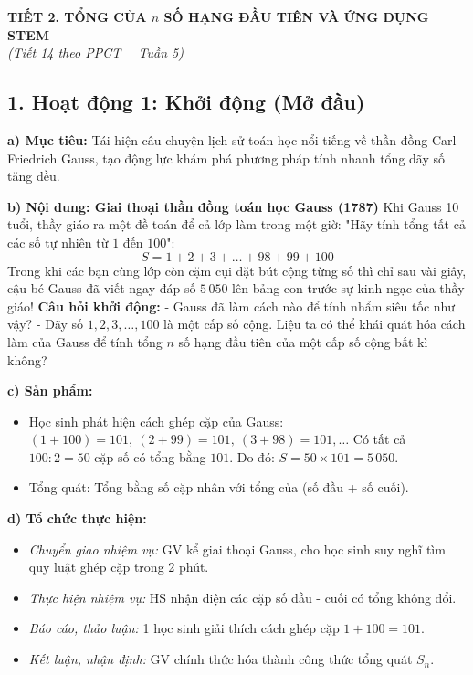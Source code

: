 \documentclass[12pt, a4paper]{article}
\begin{document}
\vspace{10pt}  
\begin{center}  
    {\fontsize{13pt}{16pt}\selectfont \textbf{TIẾT 2. TỔNG CỦA $n$ SỐ HẠNG ĐẦU TIÊN VÀ ỨNG DỤNG STEM}}\\[2pt]  
    \textit{(Tiết 14 theo PPCT \ \textbar \ Tuần 5)}  
\end{center}  
  
\subsection*{1. Hoạt động 1: Khởi động (Mở đầu)}  
  
\noindent \textbf{a) Mục tiêu:}  
Tái hiện câu chuyện lịch sử toán học nổi tiếng về thần đồng Carl Friedrich Gauss, tạo động lực khám phá phương pháp tính nhanh tổng dãy số tăng đều.  
  
\noindent \textbf{b) Nội dung: Giai thoại thần đồng toán học Gauss (1787)}  
Khi Gauss 10 tuổi, thầy giáo ra một đề toán để cả lớp làm trong một giờ: "Hãy tính tổng tất cả các số tự nhiên từ $1$ đến $100$":  
$$S = 1 + 2 + 3 + \dots + 98 + 99 + 100$$  
Trong khi các bạn cùng lớp còn cặm cụi đặt bút cộng từng số thì chỉ sau vài giây, cậu bé Gauss đã viết ngay đáp số $5\,050$ lên bảng con trước sự kinh ngạc của thầy giáo!  
\textbf{Câu hỏi khởi động:}  
- Gauss đã làm cách nào để tính nhẩm siêu tốc như vậy?  
- Dãy số $1, 2, 3, \dots, 100$ là một cấp số cộng. Liệu ta có thể khái quát hóa cách làm của Gauss để tính tổng $n$ số hạng đầu tiên của một cấp số cộng bất kì không?  
  
\noindent \textbf{c) Sản phẩm:}  
\begin{itemize}[leftmargin=0.8cm]  
    \item Học sinh phát hiện cách ghép cặp của Gauss:  
    $(1 + 100) = 101,\ (2 + 99) = 101,\ (3 + 98) = 101,\dots$  
    Có tất cả $100 : 2 = 50$ cặp số có tổng bằng $101$.  
    Do đó: $S = 50 \times 101 = 5\,050$.  
    \item Tổng quát: Tổng bằng số cặp nhân với tổng của (số đầu + số cuối).  
\end{itemize}  
  
\noindent \textbf{d) Tổ chức thực hiện:}  
\begin{itemize}[leftmargin=0.8cm]  
    \item \textit{Chuyển giao nhiệm vụ:} GV kể giai thoại Gauss, cho học sinh suy nghĩ tìm quy luật ghép cặp trong 2 phút.  
    \item \textit{Thực hiện nhiệm vụ:} HS nhận diện các cặp số đầu - cuối có tổng không đổi.  
    \item \textit{Báo cáo, thảo luận:} 1 học sinh giải thích cách ghép cặp $1+100=101$.  
    \item \textit{Kết luận, nhận định:} GV chính thức hóa thành công thức tổng quát $S_n$.  
\end{itemize}  
  
\end{document}
